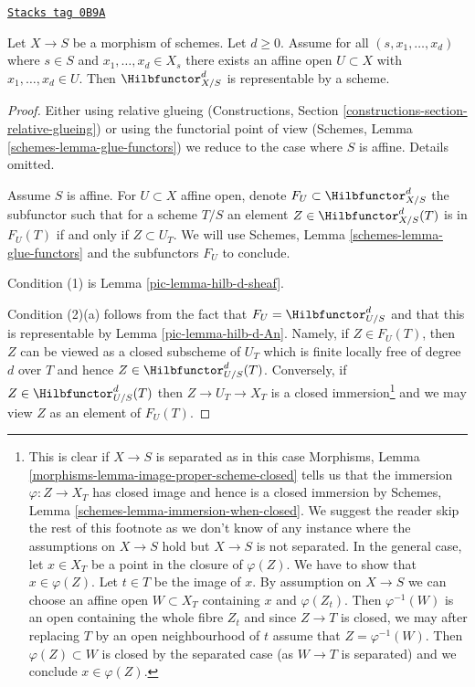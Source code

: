 \begin{proposition}
\label{pic-proposition-hilb-d-representable}
\href{https://stacks.math.columbia.edu/tag/0B9A}{\texttt{Stacks tag 0B9A}}

Let $X \to S$ be a morphism of schemes. Let $d \geq 0$. Assume
for all $(s, x_1, \ldots, x_d)$ where $s \in S$ and
$x_1, \ldots, x_d \in X_s$ there exists an affine open $U \subset X$
with $x_1, \ldots, x_d \in U$. Then $\Hilbfunctor^d_{X/S}$ is
representable by a scheme.
\end{proposition}

\begin{proof}

Either using relative glueing (Constructions, Section
\ref{constructions-section-relative-glueing}) or using
the functorial point of view
(Schemes, Lemma \ref{schemes-lemma-glue-functors})
we reduce to the case where $S$ is affine. Details omitted.

\medskip\noindent
Assume $S$ is affine. For $U \subset X$ affine open, denote
$F_U \subset \Hilbfunctor^d_{X/S}$ the subfunctor such that
for a scheme $T/S$ an element $Z \in \Hilbfunctor^d_{X/S}(T)$
is in $F_U(T)$ if and only if $Z \subset U_T$. We will use
Schemes, Lemma \ref{schemes-lemma-glue-functors}
and the subfunctors $F_U$ to conclude.

\medskip\noindent
Condition (1) is Lemma \ref{pic-lemma-hilb-d-sheaf}.

\medskip\noindent
Condition (2)(a) follows from the fact that $F_U = \Hilbfunctor^d_{U/S}$
and that this is representable by Lemma \ref{pic-lemma-hilb-d-An}.
Namely, if $Z \in F_U(T)$, then $Z$ can be viewed as a closed subscheme
of $U_T$ which is finite locally free of degree $d$ over $T$ and hence
$Z \in \Hilbfunctor^d_{U/S}(T)$. Conversely, if $Z \in \Hilbfunctor^d_{U/S}(T)$
then $Z \to U_T \to X_T$ is a closed immersion\footnote{This is clear
if $X \to S$ is separated as in this case Morphisms, Lemma
\ref{morphisms-lemma-image-proper-scheme-closed}
tells us that the immersion $\varphi : Z \to X_T$ has closed image
and hence is a closed immersion by
Schemes, Lemma \ref{schemes-lemma-immersion-when-closed}. We suggest the
reader skip the rest of this footnote as we don't know of any instance
where the assumptions on $X \to S$ hold but $X \to S$ is not separated.
In the general case, let $x \in X_T$ be a point in the closure of
$\varphi(Z)$. We have to show that $x \in \varphi(Z)$. Let $t \in T$ be the
image of $x$. By assumption on $X \to S$ we can choose an affine open
$W \subset X_T$ containing $x$ and $\varphi(Z_t)$. Then $\varphi^{-1}(W)$
is an open containing the whole fibre $Z_t$ and since $Z \to T$ is closed,
we may after replacing $T$ by an open neighbourhood of $t$ assume that
$Z = \varphi^{-1}(W)$. Then $\varphi(Z) \subset W$ is closed by the
separated case (as $W \to T$ is separated) and we conclude $x \in \varphi(Z)$.}
and we may view $Z$ as an element of $F_U(T)$.


\end{proof}
